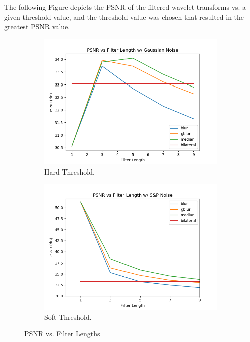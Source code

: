 \documentclass{article}
\begin{document}
The following Figure depicts the PSNR of the filtered wavelet transforms vs. a given threshold value, and the threshold value was chosen that resulted in the greatest PSNR value.

\begin{figure}[h!]
	\centering
	\begin{subfigure}[b]{0.45\linewidth}
		\includegraphics[width=\linewidth]{../../1_Resources/images/filter_length_g.png}
		\caption{Hard Threshold.}
	\end{subfigure}
	\begin{subfigure}[b]{0.45\linewidth}
		\includegraphics[width=\linewidth]{../../1_Resources/images/filter_length_sp.png}
		\caption{Soft Threshold.}
	\end{subfigure}	
	\caption{PSNR vs. Filter Lengths}
	\label{fig:filter_length}
\end{figure}
\end{document}
